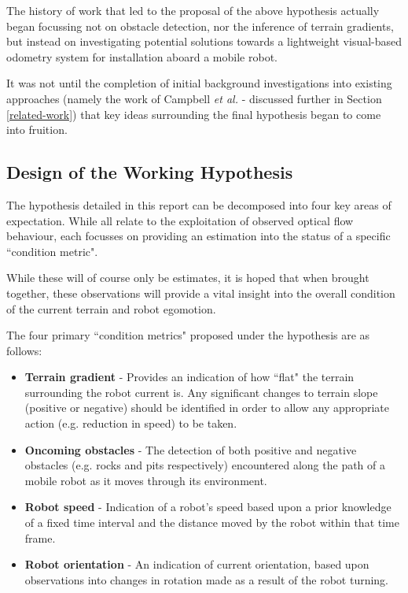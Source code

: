 The history of work that led to the proposal of the above hypothesis actually began focussing not on obstacle detection, nor the inference of terrain gradients, but instead on investigating potential solutions towards a lightweight visual-based odometry system for installation aboard a mobile robot. 

It was not until the completion of initial background investigations into existing approaches (namely the work of Campbell \textit{et al.} \cite{campbell} - discussed further in Section \ref{related-work}) that key ideas surrounding the final hypothesis began to come into fruition. 

\subsection{Design of the Working Hypothesis} 

The hypothesis detailed in this report can be decomposed into four key areas of expectation. While all relate to the exploitation of observed optical flow behaviour, each focusses on providing an estimation into the status of a specific ``condition metric". 

While these will of course only be estimates, it is hoped that when brought together, these observations will provide a vital insight into the overall condition of the current terrain and robot egomotion. 

The four primary ``condition metrics" proposed under the hypothesis are as follows:

\begin{itemize}
	\item \textbf{Terrain gradient} - Provides an indication of how ``flat" the terrain surrounding the robot current is. Any significant changes to terrain slope (positive or negative) should be identified in order to allow any appropriate action (e.g. reduction in speed) to be taken.
	\item  \textbf{Oncoming obstacles} - The detection of both positive and negative obstacles (e.g. rocks and pits respectively) encountered along the path of a mobile robot as it moves through its environment. 
	\item \textbf{Robot speed} - Indication of a robot's speed based upon a prior knowledge of a fixed time interval and the distance moved by the robot within that time frame.
	\item \textbf{Robot orientation} - An indication of current orientation, based upon observations into changes in rotation made as a result of the robot turning. 
	
\end{itemize} 


